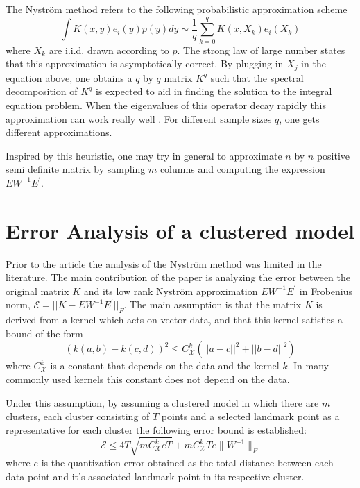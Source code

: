 \documentclass{article}
\begin{document}
The Nyström method refers to the following probabilistic approximation scheme
\begin{equation*}
    \int K(x,y)e_i(y)p(y)dy\sim \frac{1}{q} \sum_{k=0}^q K(x,X_k)e_i(X_k)
\end{equation*}
where $X_k$ are i.i.d. drawn according to $p$. The strong law of large number states that this approximation is asymptotically correct. By plugging in $X_j$ in the equation above, one obtains a $q$ by $q$ matrix $K^q$ such that the spectral decomposition of $K^q$ is expected to aid in finding the solution to the integral equation problem. When the eigenvalues of this operator decay rapidly this approximation can work really well \cite{Williams00theeffect}. For different sample sizes $q$, one gets different approximations. 

Inspired by this heuristic, one may try in general to approximate $n$ by $n$ positive semi definite matrix by sampling $m$ columns and computing the expression $EW^{-1}E^{'}$.


\section{Error Analysis of a clustered model}
Prior to the article \cite{10.1145/1390156.1390311} 
the analysis of the Nyström method was limited in the literature.
The main contribution of the paper is analyzing the error between the original matrix $K$ and its low rank Nyström approximation $EW^{-1}E^{'}$ in Frobenius norm, $\mathcal{E}=||K-EW^{-1}E^{'}||_F$. The main assumption is that the matrix $K$ is derived from a kernel which acts on vector data, and that this kernel satisfies a bound of the form
\begin{equation*}
    (k(a,b)-k(c,d))^2\leq C_{\mathcal{X}}^k(||a-c||^2+||b-d||^2)
\end{equation*}
where $C_{\mathcal{X}}^k$ is a constant that depends on the data and the kernel $k$. In many commonly used kernels this constant does not depend on the data.

Under this assumption, by assuming a clustered model in which there are $m$ clusters, 
each cluster consisting of $T$ points and a selected landmark point as a representative for each cluster the following error bound is established:
\begin{equation*}
    \mathcal{E} \leq 4T\sqrt{mC_{\mathcal{X}}^k eT}+mC_{\mathcal{X}}^k Te \|W^{-1}\|_F
\end{equation*}
where $e$ is the quantization error obtained as the total distance between each data point and it's associated landmark point in its respective cluster.
\end{document}
